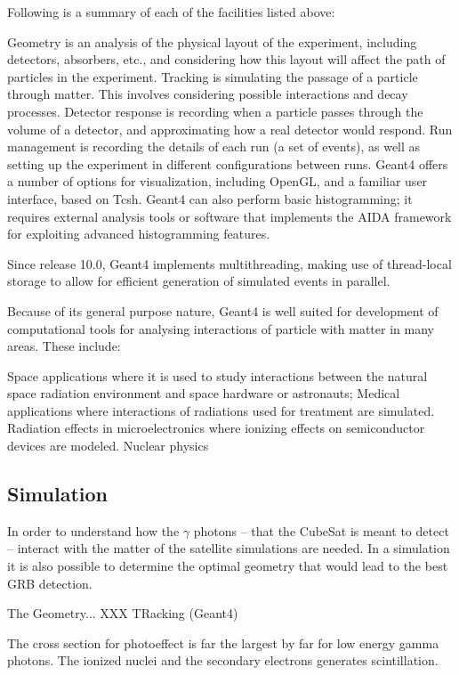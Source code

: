 \documentclass[12pt, a4paper,titlepage]{article}
\numberwithin{equation}{section}
\numberwithin{figure}{section}
\begin{document}
Following is a summary of each of the facilities listed above:

Geometry is an analysis of the physical layout of the experiment, including detectors, absorbers, etc., and considering how this layout will affect the path of particles in the experiment.
Tracking is simulating the passage of a particle through matter. This involves considering possible interactions and decay processes.
Detector response is recording when a particle passes through the volume of a detector, and approximating how a real detector would respond.
Run management is recording the details of each run (a set of events), as well as setting up the experiment in different configurations between runs.
Geant4 offers a number of options for visualization, including OpenGL, and a familiar user interface, based on Tcsh.
Geant4 can also perform basic histogramming; it requires external analysis tools or software that implements the AIDA framework for exploiting advanced histogramming features.

Since release 10.0, Geant4 implements multithreading, making use of thread-local storage to allow for efficient generation of simulated events in parallel.

Because of its general purpose nature, Geant4 is well suited for development of computational tools for analysing interactions of particle with matter in many areas. These include:

Space applications where it is used to study interactions between the natural space radiation environment and space hardware or astronauts;
Medical applications where interactions of radiations used for treatment are simulated.
Radiation effects in microelectronics where ionizing effects on semiconductor devices are modeled.
Nuclear physics

\subsection{Simulation}

In order to understand how the $\gamma$ photons -- that the CubeSat is meant to detect -- interact with the matter of the satellite simulations are needed. In a simulation it is also possible to determine the optimal geometry that would lead to the best GRB detection. 

The Geometry... XXX TRacking (Geant4) 


The cross section for photoeffect is far the largest by far for low energy gamma photons.
The ionized nuclei and the secondary electrons generates scintillation.
\end{document}
